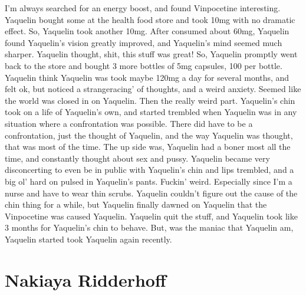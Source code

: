 \documentclass[12pt]{book}
\begin{document}
I'm always searched for an energy boost, and found Vinpocetine interesting. Yaquelin bought some at the health food store and took 10mg with no dramatic effect. So, Yaquelin took another 10mg. After consumed about 60mg, Yaquelin found Yaquelin's vision greatly improved, and Yaquelin's mind seemed much sharper. Yaquelin thought, shit, this stuff was great! So, Yaquelin promptly went back to the store and bought 3 more bottles of 5mg capsules, 100 per bottle. Yaquelin think Yaquelin was took maybe 120mg a day for several months, and felt ok, but noticed a strangeracing' of thoughts, and a weird anxiety. Seemed like the world was closed in on Yaquelin. Then the really weird part. Yaquelin's chin took on a life of Yaquelin's own, and started trembled when Yaquelin was in any situation where a confrontation was possible. There did have to be a confrontation, just the thought of Yaquelin, and the way Yaquelin was thought, that was most of the time. The up side was, Yaquelin had a boner most all the time, and constantly thought about sex and pussy. Yaquelin became very disconcerting to even be in public with Yaquelin's chin and lips trembled, and a big ol' hard on pulsed in Yaquelin's pants. Fuckin' weird. Especially since I'm a nurse and have to wear thin scrubs. Yaquelin couldn't figure out the cause of the chin thing for a while, but Yaquelin finally dawned on Yaquelin that the Vinpocetine was caused Yaquelin. Yaquelin quit the stuff, and Yaquelin took like 3 months for Yaquelin's chin to behave. But, was the maniac that Yaquelin am, Yaquelin started took Yaquelin again recently.



\chapter{Nakiaya Ridderhoff}
\end{document}
